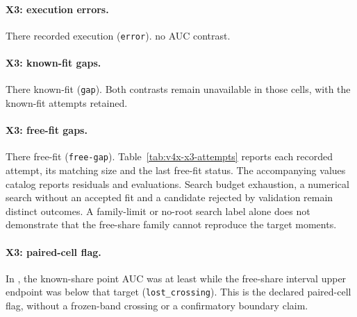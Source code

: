 \paragraph{X3: execution errors.}
There   recorded execution  (\texttt{error}).
 no AUC contrast.

\paragraph{X3: known-fit gaps.}
There   known-fit  (\texttt{gap}).
Both contrasts remain unavailable in those cells, with the known-fit attempts retained.

\paragraph{X3: free-fit gaps.}
There   free-fit  (\texttt{free-gap}).
Table~\ref{tab:v4x-x3-attempts} reports each recorded attempt, its matching size and the last free-fit status. The accompanying values catalog reports residuals and evaluations.
Search budget exhaustion, a numerical search without an accepted fit and a candidate rejected by validation remain distinct outcomes.
A family-limit or no-root search label alone does not demonstrate that the free-share family cannot reproduce the target moments.

\paragraph{X3: paired-cell flag.}
In  , the known-share point AUC was at least  while the free-share interval upper endpoint was below that target (\texttt{lost\_crossing}).
This is the declared paired-cell flag, without a frozen-band crossing or a confirmatory boundary claim.

